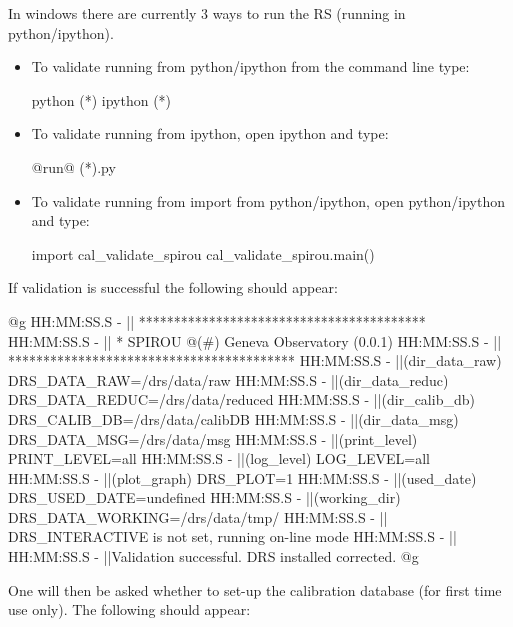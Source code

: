 \noindent In windows there are currently 3 ways to run the RS (running in python/ipython).

\begin{itemize}
\item To validate running from python/ipython from the command line type:
\begin{cmdbox}
python (*\calvalidate*)
ipython (*\calvalidate*)
\end{cmdbox}

\item To validate running from ipython, open ipython and type:
\begin{pythonbox}
@run@ (*\calvalidate*).py
\end{pythonbox}

\item To validate running from import from python/ipython, open python/ipython and type:
\begin{pythonbox}
import cal_validate_spirou
cal_validate_spirou.main()
\end{pythonbox}

\end{itemize}


\noindent If validation is successful the following should appear:

\begin{cmdboxprintspecial}
@g
HH:MM:SS.S -   || *****************************************
HH:MM:SS.S -   || * SPIROU @(#) Geneva Observatory (0.0.1)
HH:MM:SS.S -   || *****************************************
HH:MM:SS.S -   ||(dir_data_raw)      DRS_DATA_RAW=/drs/data/raw
HH:MM:SS.S -   ||(dir_data_reduc)    DRS_DATA_REDUC=/drs/data/reduced
HH:MM:SS.S -   ||(dir_calib_db)      DRS_CALIB_DB=/drs/data/calibDB
HH:MM:SS.S -   ||(dir_data_msg)      DRS_DATA_MSG=/drs/data/msg
HH:MM:SS.S -   ||(print_level)       PRINT_LEVEL=all         %
HH:MM:SS.S -   ||(log_level)         LOG_LEVEL=all         %
HH:MM:SS.S -   ||(plot_graph)        DRS_PLOT=1            %
HH:MM:SS.S -   ||(used_date)         DRS_USED_DATE=undefined
HH:MM:SS.S -   ||(working_dir)       DRS_DATA_WORKING=/drs/data/tmp/
HH:MM:SS.S -   ||                    DRS_INTERACTIVE is not set, running on-line mode
HH:MM:SS.S -   ||
HH:MM:SS.S -   ||Validation successful. DRS installed corrected.
@g
\end{cmdboxprintspecial}

\noindent One will then be asked whether to set-up the calibration database (for first time use only). The following should appear:

